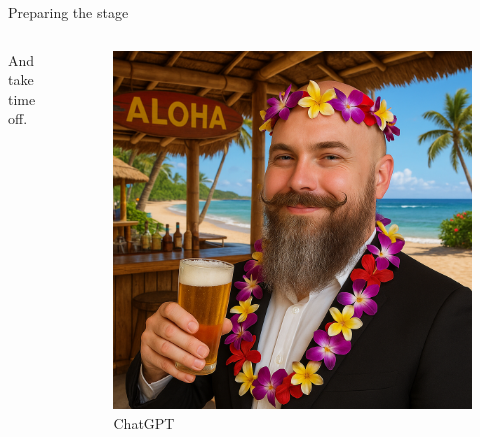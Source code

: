 \documentclass[aspectratio=169]{beamer}
\begin{document}
\begin{frame}{Preparing the stage}

  \begin{columns}
    \begin{column}{0.4\textwidth}
      And take time off.
    \end{column}
    \begin{column}{0.4\textwidth}
      \begin{figure}
        \includegraphics[height = 0.7\textheight]{images/urs_hawaii.png}
        \caption{\footnotesize ChatGPT}
      \end{figure}
    \end{column}
  \end{columns}

\end{frame}
\end{document}
